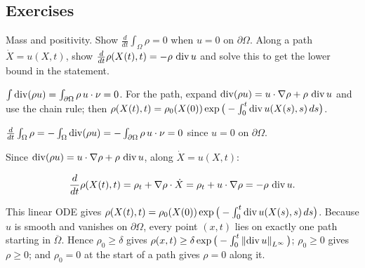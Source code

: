 \subsection*{Exercises}

\begin{exercise}
  Mass and positivity. Show $\frac{d}{dt}\int_\Omega\rho = 0$ when $u = 0$ on $\partial\Omega$. Along a path $\dot X = u(X,t)$, show $\frac{d}{dt}\rho(X(t),t) = -\rho\,\operatorname{div} u$ and solve this to get the lower bound in the statement.
  \begin{hint}
    $\int\operatorname{div}(\rho u) = \int_{\partial\Omega}\rho\,u\cdot\nu = 0$. For the path, expand $\operatorname{div}(\rho u) = u\cdot\nabla\rho + \rho\,\operatorname{div} u$ and use the chain rule; then $\rho(X(t),t) = \rho_0(X(0))\exp\big(-\int_0^t \operatorname{div} u(X(s),s)\,ds\big)$.
  \end{hint}
  \begin{solution}
    $\frac{d}{dt}\int_\Omega\rho = -\int_\Omega\operatorname{div}(\rho u) = -\int_{\partial\Omega}\rho\,u\cdot\nu = 0$ since $u = 0$ on $\partial\Omega$.

    Since $\operatorname{div}(\rho u) = u\cdot\nabla\rho + \rho\,\operatorname{div} u$, along $\dot X = u(X,t)$:

    \[ \frac{d}{dt}\rho(X(t),t) = \rho_t + \nabla\rho\cdot\dot X = \rho_t + u\cdot\nabla\rho = -\rho\,\operatorname{div} u. \]

    This linear ODE gives $\rho(X(t),t) = \rho_0(X(0))\exp\big(-\int_0^t\operatorname{div} u(X(s),s)\,ds\big)$. Because $u$ is smooth and vanishes on $\partial\Omega$, every point $(x,t)$ lies on exactly one path starting in $\overline\Omega$. Hence $\rho_0 \ge \delta$ gives $\rho(x,t) \ge \delta\exp\big(-\int_0^t\left\lVert \operatorname{div} u\right\rVert_{L^\infty}\big)$; $\rho_0 \ge 0$ gives $\rho \ge 0$; and $\rho_0 = 0$ at the start of a path gives $\rho = 0$ along it.
  \end{solution}
\end{exercise}

